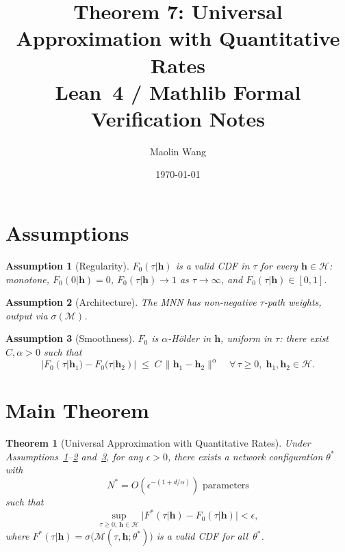 \documentclass[12pt]{article}
\title{Theorem 7: Universal Approximation with Quantitative Rates\\
\large Lean~4 / Mathlib Formal Verification Notes}
\author{Maolin Wang}
\date{\today}
\newtheorem{theorem}{Theorem}[section]
\newtheorem{assumption}{Assumption}
\theoremstyle{remark}
\begin{document}
\maketitle

\section{Assumptions}

\begin{assumption}[Regularity]\label{assumption:regularity}
$F_0(\tau|\boldsymbol{h})$ is a valid CDF in $\tau$ for every $\boldsymbol{h}\in\mathcal{H}$:
monotone, $F_0(0|\boldsymbol{h})=0$, $F_0(\tau|\boldsymbol{h})\to 1$ as $\tau\to\infty$,
and $F_0(\tau|\boldsymbol{h})\in[0,1]$.
\end{assumption}

\begin{assumption}[Architecture]\label{assumption:architecture}
The MNN has non-negative $\tau$-path weights, output via $\sigma(\mathcal{M})$.
\end{assumption}

\begin{assumption}[Smoothness]\label{assumption:smoothness}
$F_0$ is $\alpha$-H\"older in $\boldsymbol{h}$, uniform in $\tau$:
there exist $C,\alpha>0$ such that
\[
  |F_0(\tau|\boldsymbol{h}_1) - F_0(\tau|\boldsymbol{h}_2)|
  \;\le\; C\,\|\boldsymbol{h}_1 - \boldsymbol{h}_2\|^{\alpha}
  \quad \forall\,\tau\ge 0,\;\boldsymbol{h}_1,\boldsymbol{h}_2\in\mathcal{H}.
\]
\end{assumption}

\section{Main Theorem}

\begin{theorem}[Universal Approximation with Quantitative Rates]
\label{thm:universal_approx}
Under Assumptions~\ref{assumption:regularity}--\ref{assumption:architecture}
and~\ref{assumption:smoothness}, for any $\epsilon > 0$, there exists a
network configuration $\theta^*$ with
\[
  N^* = O\!\left(\epsilon^{-(1+d/\alpha)}\right) \text{ parameters}
\]
such that
\[
  \sup_{\tau \geq 0,\, \boldsymbol{h} \in \mathcal{H}}
  \bigl|F^*(\tau|\boldsymbol{h}) - F_0(\tau|\boldsymbol{h})\bigr| < \epsilon,
\]
where $F^*(\tau|\boldsymbol{h}) = \sigma\!\bigl(\mathcal{M}(\tau,\boldsymbol{h};\theta^*)\bigr)$
is a valid CDF for all~$\theta^*$.
\end{theorem}
\end{document}
